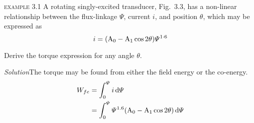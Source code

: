 \documentclass[a4paper,numbers=noenddot,12pt]{scrbook}
\begin{document}
            \noindent\textsc{example} 3.1 A rotating singly-excited transducer, Fig.\ 3.3, has a non-linear relationship between the flux-linkage $\varPsi$, current $i$, and position $\theta$, which may be expressed as
            \begin{equation*}
                i = (\textup{A}_0 - \textup{A}_1 \cos 2\theta)\varPsi^{1\cdot6}
            \end{equation*}

            Derive the torque expression for any angle $\theta$.

            \textit{Solution}\@ The torque may be found from either the field energy or the co-energy.
            \begin{align*}
                W_{fe} & = \int_0^{\varPsi} i \dif \varPsi \\
                & = \int_0^{\varPsi} \varPsi^{1.6} (\textup{A}_0 - \textup{A}_1 \cos 2 \theta) \dif \varPsi
            \end{align*}
\end{document}
